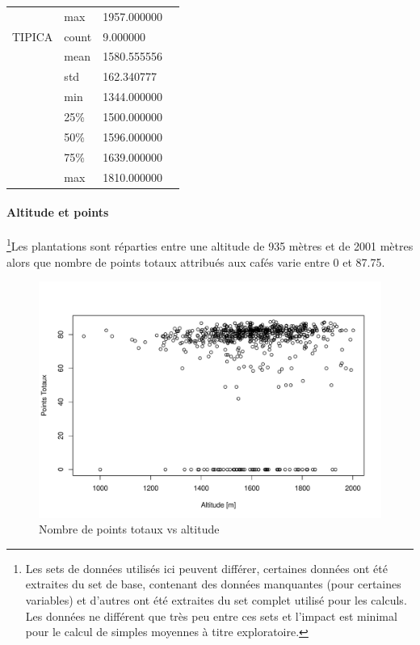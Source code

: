 \begin{table}[H]
\begin{tabular}{llll}
		&max      & 1957.000000                                      &  \\
		TIPICA   & count                                & 9.000000   &  \\
		&mean     & 1580.555556                                      &  \\
		&std      & 162.340777                                       &  \\
		&min      & 1344.000000                                      &  \\
		&25\%     & 1500.000000                                      &  \\
		&50\%     & 1596.000000                                      &  \\
		&75\%     & 1639.000000                                      &  \\
		&max      & 1810.000000            & 
	\end{tabular}
\end{table}
\newpage
\paragraph{Altitude et points} \footnote{Les sets de données utilisés ici peuvent différer, certaines données ont été extraites du set de base, contenant des données manquantes (pour certaines variables) et d'autres ont été extraites du set complet utilisé pour les calculs. Les données ne différent que très peu entre ces sets et l'impact est minimal pour le calcul de simples moyennes à titre exploratoire.}Les plantations sont réparties entre une altitude de 935 mètres et de 2001 mètres alors que nombre de points totaux attribués aux cafés varie entre 0 et 87.75. 

\begin{figure}[H]
	\centering
	\includegraphics[width=0.7\linewidth]{img/Exploration/plotAltitudeVsPuntajeTotal}
	\caption{Nombre de points totaux vs altitude}
	\label{fig:plotaltitudevspuntajetotal}
\end{figure}


